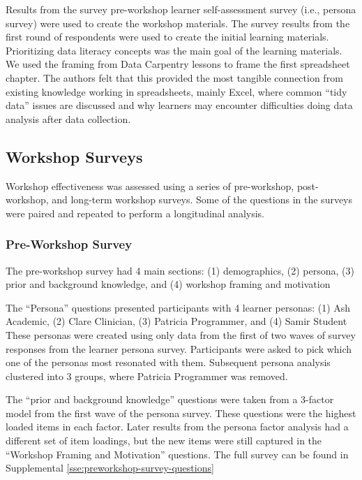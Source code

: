 \documentclass[030-workshop.tex]{subfiles}
\begin{document}
    Results from the survey pre-workshop learner self-assessment survey (i.e., persona survey)
    were used to create the workshop materials.
    The survey results from the first round of respondents were used to create the initial
    learning materials.
    Prioritizing data literacy concepts was the main goal of the learning materials.
    We used the framing from Data Carpentry lessons to frame the first spreadsheet chapter.
    The authors felt that this provided the most tangible connection from existing knowledge
    working in spreadsheets, mainly Excel,
    where common ``tidy data'' issues are discussed and why learners may encounter difficulties
    doing data analysis after data collection.

  \subsection{Workshop Surveys}

    Workshop effectiveness was assessed using a series of pre-workshop, post-workshop, and long-term workshop surveys.
    Some of the questions in the surveys were paired and repeated to perform a longitudinal analysis.

  \subsubsection{Pre-Workshop Survey}

      The pre-workshop survey had 4 main sections:
      (1) demographics,
      (2) persona,
      (3) prior and background knowledge, and
      (4) workshop framing and motivation

      The ``Persona'' questions presented participants with 4 learner personas:
      (1) Ash Academic,
      (2) Clare Clinician,
      (3) Patricia Programmer, and
      (4) Samir Student
      These personas were created using only data from the first of two waves of survey responses from the learner persona survey.
      Participants were asked to pick which one of the personas most resonated with them.
      Subsequent persona analysis clustered into 3 groups, where Patricia Programmer was removed.

      The ``prior and background knowledge'' questions were taken from
      a 3-factor model from the first wave of the persona survey. %
      These questions were the highest loaded items in each factor.
      Later results from the persona factor analysis had a different set of item loadings,
      but the new items were still captured in the ``Workshop Framing and Motivation'' questions.
      The full survey can be found in
      Supplemental \ref{sse:preworkshop-survey-questions}
\end{document}
